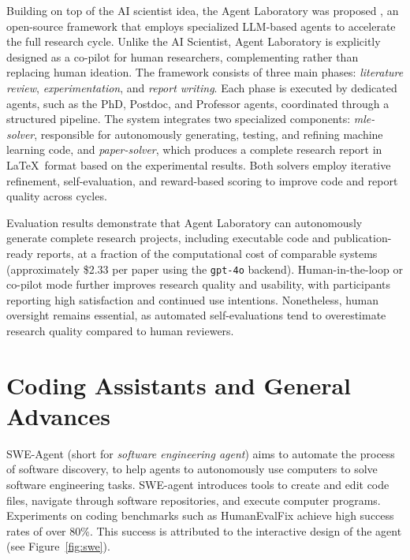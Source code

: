 Building on top of the AI scientist idea, the Agent Laboratory was proposed \citep{schmidgall2025agent}, an open-source framework that employs specialized LLM-based agents to accelerate the full research cycle. Unlike the AI Scientist, Agent Laboratory is explicitly designed as a co-pilot for human researchers, complementing rather than replacing human ideation.
%
The framework consists of three main phases: \emph{literature review}, \emph{experimentation}, and \emph{report writing}. Each phase is executed by dedicated agents, such as the PhD, Postdoc, and Professor agents, coordinated through a structured pipeline. The system integrates two specialized components: \emph{mle-solver}, responsible for autonomously generating, testing, and refining machine learning code, and \emph{paper-solver}, which produces a complete research report in \LaTeX\ format based on the experimental results. Both solvers employ iterative refinement, self-evaluation, and reward-based scoring to improve code and report quality across cycles.

Evaluation results demonstrate that Agent Laboratory can autonomously generate complete research projects, including executable code and publication-ready reports, at a fraction of the computational cost of comparable systems (approximately \$2.33 per paper using the \texttt{gpt-4o} backend). Human-in-the-loop or co-pilot mode further improves research quality and usability, with participants reporting high satisfaction and continued use intentions. Nonetheless, human oversight remains essential, as automated self-evaluations tend to overestimate research quality compared to human reviewers.


\section{Coding Assistants and General Advances}

SWE-Agent (short for {\em software engineering agent}) \citep{yang2024swe} aims to automate the process of software discovery, to help agents to autonomously use computers to solve software engineering tasks. SWE-agent introduces tools to create and edit code files, navigate through software repositories, and execute computer programs. Experiments on coding benchmarks such as HumanEvalFix achieve high success rates of over 80\%. This success is attributed to the interactive design of the agent (see Figure~\ref{fig:swe}). 



